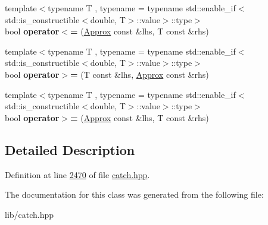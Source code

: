 \begin{DoxyCompactItemize}
\item 
\mbox{\label{classCatch_1_1Detail_1_1Approx_a6040b908588745570847d7ae8483b091}} 
{\footnotesize template$<$typename T , typename  = typename std\+::enable\+\_\+if$<$std\+::is\+\_\+constructible$<$double, T$>$\+::value$>$\+::type$>$ }\\bool {\bfseries operator$<$=} (\mbox{\hyperlink{classCatch_1_1Detail_1_1Approx}{Approx}} const \&lhs, T const \&rhs)
\item 
\mbox{\label{classCatch_1_1Detail_1_1Approx_affd27efc62be386daeecb7a09e828d44}} 
{\footnotesize template$<$typename T , typename  = typename std\+::enable\+\_\+if$<$std\+::is\+\_\+constructible$<$double, T$>$\+::value$>$\+::type$>$ }\\bool {\bfseries operator$>$=} (T const \&lhs, \mbox{\hyperlink{classCatch_1_1Detail_1_1Approx}{Approx}} const \&rhs)
\item 
\mbox{\label{classCatch_1_1Detail_1_1Approx_a5899b8a36725406701e2ebded2971ee6}} 
{\footnotesize template$<$typename T , typename  = typename std\+::enable\+\_\+if$<$std\+::is\+\_\+constructible$<$double, T$>$\+::value$>$\+::type$>$ }\\bool {\bfseries operator$>$=} (\mbox{\hyperlink{classCatch_1_1Detail_1_1Approx}{Approx}} const \&lhs, T const \&rhs)
\end{DoxyCompactItemize}


\subsection{Detailed Description}


Definition at line \mbox{\hyperlink{catch_8hpp_source_l02470}{2470}} of file \mbox{\hyperlink{catch_8hpp_source}{catch.\+hpp}}.



The documentation for this class was generated from the following file\+:\begin{DoxyCompactItemize}
\item 
lib/catch.\+hpp\end{DoxyCompactItemize}
